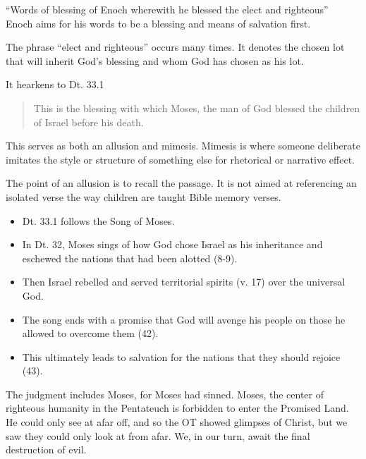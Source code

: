 \documentclass{beamer}
\begin{document}
\begin{frame}
  ``Words of blessing of Enoch wherewith he blessed the elect and righteous''\\
  Enoch aims for his words to be a blessing and means of salvation first.
\end{frame}

\begin{frame}
  The phrase ``elect and righteous'' occurs many times.
  It denotes the chosen lot that will inherit God's blessing and whom God has chosen as his lot.
\end{frame}

\begin{frame}
  It hearkens to Dt. 33.1
  \begin{quote}
	This is the blessing with which Moses, the man of God blessed the children of Israel before his death.
  \end{quote}
\end{frame}

\begin{frame}
  This serves as both an allusion and mimesis.
  Mimesis is where someone deliberate imitates the style or structure of something else for rhetorical or narrative effect.
\end{frame}

\begin{frame}
  The point of an allusion is to recall the passage.
  It is not aimed at referencing an isolated verse the way children are taught Bible memory verses.
\end{frame}

\begin{frame}
  \begin{itemize}
	\item Dt. 33.1 follows the Song of Moses.\pause
	\item In Dt. 32, Moses sings of how God chose Israel as his inheritance and eschewed the nations that had been alotted (8-9).\pause
	\item Then Israel rebelled and served territorial spirits (v. 17) over the universal God.\pause
	\item The song ends with a promise that God will avenge his people on those he allowed to overcome them (42).\pause
	\item This ultimately leads to salvation for the nations that they should rejoice (43).
  \end{itemize}
\end{frame}

\begin{frame}
  The judgment includes Moses, for Moses had sinned.
  Moses, the center of righteous humanity in the Pentateuch is forbidden to enter the Promised Land.
  He could only see at afar off, and so the OT showed glimpses of Christ, but we saw they could only look at from afar.
  We, in our turn, await the final destruction of evil.
\end{frame}
\end{document}
